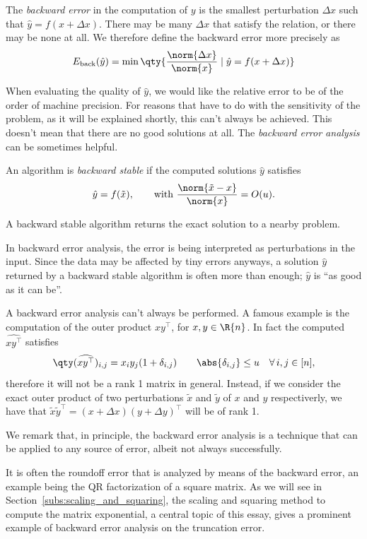 \begin{definizione}
	The \emph{backward error} in the computation of $y$ is the smallest perturbation $\Delta{x}$ such that $\hat{y}=f(x+\Delta{x})$. There may be many $\Delta{x}$ that satisfy the relation, or there may be none at all. We therefore define the backward error more precisely as
	\[
		E_{\textup{back}}(\hat{y})=\min\qty{\frac{\norm{\Delta{x}}}{\norm{x}}\mid\hat{y}=f(x+\Delta{x})}
	\]
\end{definizione}

When evaluating the quality of $\hat{y}$, we would like the relative error to be of the order of machine precision. For reasons that have to do with the sensitivity of the problem, as it will be explained shortly, this can't always be achieved. This doesn't mean that there are no good solutions at all. 
The \emph{backward error analysis} can be sometimes helpful.

\begin{definizione}
	An algorithm is \emph{backward stable} if the computed solutions $\hat{y}$ satisfies
	\[
		\hat{y}=f(\tilde{x}),\qquad\text{with}\ \frac{\norm{\tilde{x}-x}}{\norm{x}}=O(u).
	\]	
\end{definizione}
 A backward stable algorithm returns the exact solution to a nearby problem.

In backward error analysis, the error is being interpreted as perturbations in the input. Since the data may be affected by tiny errors anyways, a solution $\hat{y}$ returned by a backward stable algorithm is often more than enough; $\hat{y}$ is ``as good as it can be''.

\begin{oss*}
	A backward error analysis can't always be performed. A famous example is the computation of the outer product $xy^{\top}$, for $x,y\in\R{n}$. In fact the computed $\widehat{xy^{\top}}$ satisfies
	\[
		\qty(\widehat{xy^{\top}})_{i,j}=x_iy_j(1+\delta_{i,j})\qquad\abs{\delta_{i,j}}\le u\quad\forall\,i,j\in[n],
	\]
	therefore it will not be a rank 1 matrix in general. Instead, if we consider the exact outer product of two perturbations $\tilde{x}$ and $\tilde{y}$ of $x$ and $y$ respectiverly, we have that $\tilde{x}\tilde{y}^{\top}=(x+\Delta{x})(y+\Delta{y})^{\top}$ will be of rank 1.
\end{oss*}

\begin{oss*}
	We remark that, in principle, the backward error analysis is a technique that can be applied to any source of error, albeit not always successfully. 
	
	It is often the roundoff error that is analyzed by means of the backward error, an example being the QR factorization of a square matrix. As we will see in Section~\vref{subs:scaling_and_squaring}, the scaling and squaring method to compute the matrix exponential, a central topic of this essay, gives a prominent example of backward error analysis on the truncation error. 
\end{oss*}

